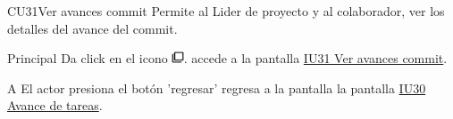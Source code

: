 \begin{UseCase}{CU31}{Ver avances commit}{
		Permite al Lider de proyecto y al colaborador, ver los detalles del avance del commit.
	}
	\end{UseCase}
	\begin{UCtrayectoria}{Principal}
		\UCpaso[\UCactor] Da click en el icono \includegraphics[height=10pt]{./images/iconos/ic_filter_none_black_18dp.png}.
		\UCpaso[\UCsist] accede a la pantalla \hyperref[fig:IU31]{IU31 Ver avances commit}. \label{item:cu30Item1}
	\end{UCtrayectoria}

	\begin{UCtrayectoriaA}{A}{ El actor presiona el botón 'regresar'}
			\UCpaso regresa a la pantalla la pantalla \hyperref[fig:IU30]{IU30 Avance de tareas}.
		\end{UCtrayectoriaA}

